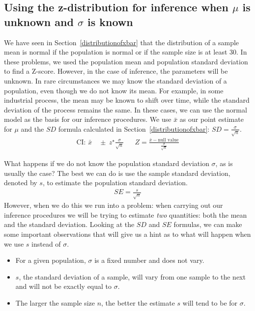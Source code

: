 \subsection{Using the z-distribution for inference when $\mu$ is unknown and $\sigma$ is known}
\label{nearlyNormalPopWithKnownSD}

We have seen in Section~\ref{distributionofxbar} that the distribution of a sample mean is normal if the population is normal or if the sample size is at least 30. In these problems, we used the population mean and population standard deviation to find a Z-score. However, in the case of inference, the parameters will be unknown. In rare circumstances we may know the standard deviation of a population, even though we do not know its mean. For example, in some industrial process, the mean may be known to shift over time, while the standard deviation of the process remains the same. In these cases, we can use the normal model as the basis for our inference procedures. We use $\bar{x}$ as our point estimate for $\mu$ and the $SD$ formula calculated in Section~\ref{distributionofxbar}: $SD =\frac{\sigma}{\sqrt{n}}$.
\begin{align*}
\text{CI:  } \bar{x} &\ \pm \ z^{\star}\frac{\sigma}{\sqrt{n}}
&&Z = \frac{\bar{x} - \text{null value}}{\frac{\sigma}{\sqrt{n}}}
\end{align*}

What happens if we do not know the population standard deviation $\sigma$, as is usually the case?  The best we can do is use the sample standard deviation, denoted by $s$, to estimate the population standard deviation.
\begin{align*}
SE= \frac{s}{\sqrt{n}}
\end{align*}
However, when we do this we run into a problem:  when carrying out our inference procedures we will be trying to estimate \emph{two} quantities: both the mean and the standard deviation. Looking at the $SD$ and $SE$ formulas, we can make some important observations that will give us a hint as to what will happen when we use $s$ instead of $\sigma$.
\begin{itemize}
\setlength{\itemsep}{0mm}
\item For a given population, $\sigma$ is a fixed number and does not vary.
\item $s$, the standard deviation of a sample, will vary from one sample to the next and will not be exactly equal to $\sigma$.
\item The larger the sample size $n$, the better the estimate $s$ will tend to be for $\sigma$.
\end{itemize}

